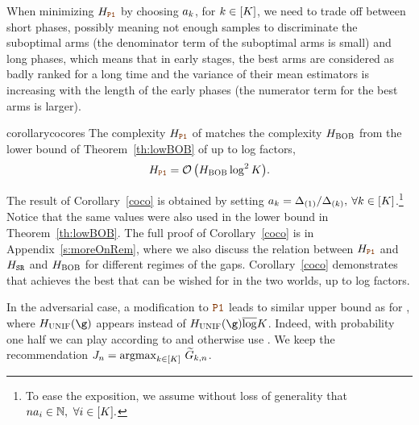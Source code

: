 When minimizing $\complexityProOne$ by choosing $a_k$, for $k\in[K]$, we need to trade off between
short phases, possibly meaning not enough samples 
to discriminate the suboptimal arms (the denominator term of the suboptimal arms is small) and long phases,
which means that in early stages, the best arms are considered as badly 
ranked for a long time and the variance of their mean estimators is increasing 
with the length of the early phases (the numerator term for the best arms is larger).
%
\begin{restatable}{corollary}{cocores}\label{coco} %
	The complexity $\complexityProOne$ of \Pone{} matches the  complexity $H_{{\normalfont \textsc{{BOB}}}}$
	from the lower bound of Theorem~\ref{th:lowBOB}
	of up to log factors,
	\[\complexityProOne = \cO\left(\complexityBoth\log^2\nArms\right)\!.\]
\end{restatable}
\noindent The result of Corollary~\ref{coco} is obtained by setting  $a_k =   \Delta_{(1)}/\Delta_{(k)},$ $\forall k \in[K]$.\footnote{To ease the exposition, we assume without 
	loss of generality that 
	$    na_i\in\mathbb{N},~ \forall i \in[K].$}  Notice that the same values  were also 
used in the lower bound in Theorem~\ref{th:lowBOB}. The full proof  of Corollary~\ref{coco}
is in Appendix~\ref{s:moreOnRem}, 
where we also discuss the relation between 
$\complexityProOne$ and $H_{{\normalfont \texttt{SR}}}$ and 
$H_{{\normalfont \textsc{{BOB}}}}$ for different regimes of the 
gaps.
Corollary~\ref{coco} demonstrates that \Pone{} achieves the best that can be wished 
for in the two worlds, up to log factors.
%
%
\begin{remark}
	In the adversarial case, a  modification to $\Pone{}$ leads to similar upper bound as for \RULE{},  where  $\complexityUnif(\gainVector)$ appears instead of $\complexityUnif(\gainVector)\bar\log \nArms$.
	Indeed, with probability one half we can play according to \RULE{} and otherwise use \Pone{}. We keep the  recommendation $J_n=\mathrm{argmax}_{k\in[K]}~ 
	\widetilde{G}_{k,n}$.
\end{remark}
